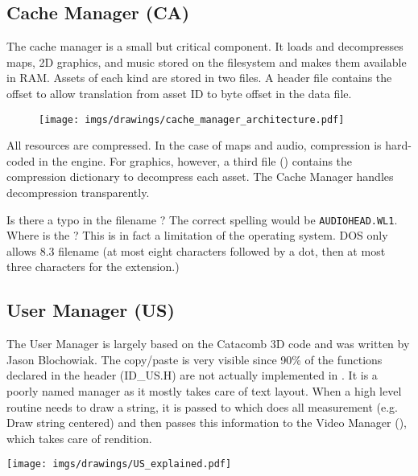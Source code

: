 \documentclass[book.tex]{subfiles}
\begin{document}
\subsection{Cache Manager (CA)}
The cache manager is a small but critical component. It loads and decompresses maps, 2D graphics, and music stored on the filesystem and makes them available in RAM. Assets of each kind are stored in two files. A header file contains the offset to allow translation from asset ID to byte offset in the data file.\\
 \par
\begin{figure}[H]
\centering
 \texttt{[image: imgs/drawings/cache\_manager\_architecture.pdf]}
 \end{figure}
 \par
{} All resources are compressed. In the case of maps and audio, compression is hard-coded in the engine. For graphics, however, a third file () contains the compression dictionary to decompress each asset. The Cache Manager handles decompression transparently.\\
\par
{} Is there a typo in the filename  ? The correct spelling would be \texttt{\justify AUDIOHEAD.WL1}. Where is the ? This is in fact a limitation of the operating system. DOS only allows 8.3 filename (at most eight characters followed by a dot, then at most three characters for the extension.)








\subsection{User Manager (US)}
\begin{minipage}{0.7\textwidth}
The User Manager is largely based on the Catacomb 3D code and was written by Jason Blochowiak. The copy/paste is very visible since 90\% of the functions declared in the header (ID\_US.H) are not actually implemented in . 
It is a poorly named manager as it mostly takes care of text layout. When a  high level routine needs to draw a string, it is passed to  which does all measurement (e.g. Draw string centered)
and then passes this information to the Video Manager (), which takes care of rendition.
\end{minipage}
\begin{minipage}{0.3\textwidth}
\begin{flushright}
\texttt{[image: imgs/drawings/US\_explained.pdf]}
\end{flushright}
\end{minipage}
\noindent
\\
\end{document}
